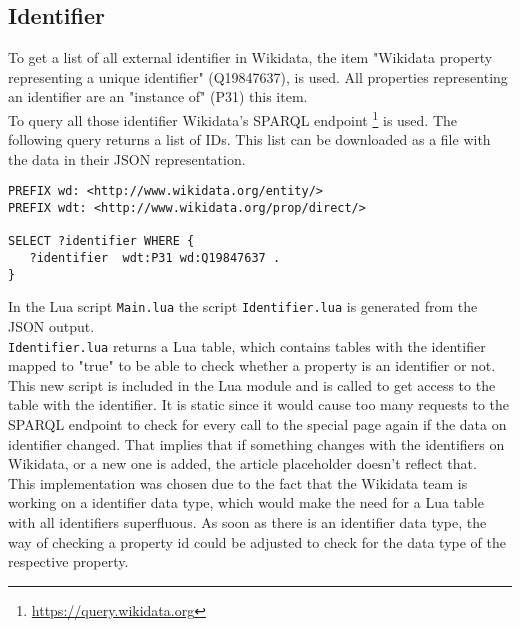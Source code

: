 \subsection{Identifier}

To get a list of all external identifier in Wikidata, the item "Wikidata property representing a unique identifier" (Q19847637), is used. All properties representing an identifier are an "instance of" (P31) this item. \\
To query all those identifier Wikidata's SPARQL endpoint \footnote{\href{https://query.wikidata.org}{https://query.wikidata.org}} is used. The following query returns a list of IDs. This list can be downloaded as a file with the data in their JSON representation. \\

\begin{lstlisting}[frame=single] 
PREFIX wd: <http://www.wikidata.org/entity/>
PREFIX wdt: <http://www.wikidata.org/prop/direct/>

SELECT ?identifier WHERE {
   ?identifier  wdt:P31 wd:Q19847637 . 
}
\end{lstlisting}
In the Lua script \texttt{Main.lua} the script \texttt{Identifier.lua} is generated from the JSON output. \\  \texttt{Identifier.lua} returns a Lua table, which contains tables with the identifier mapped to "true" to be able to check whether a property is an identifier or not. This new script is included in the Lua module and is called to get access to the table with the identifier. It is static since it would cause too many requests to the SPARQL endpoint to check for every call to the special page again if the data on identifier changed. That implies that if something changes with the identifiers on Wikidata, or a new one is added, the article placeholder doesn't reflect that. \\
This implementation was chosen due to the fact that the Wikidata team is working on a identifier data type, which would make the need for a Lua table with all identifiers superfluous. As soon as there is an identifier data type, the way of checking a property id could be adjusted to check for the data type of the respective property. 
